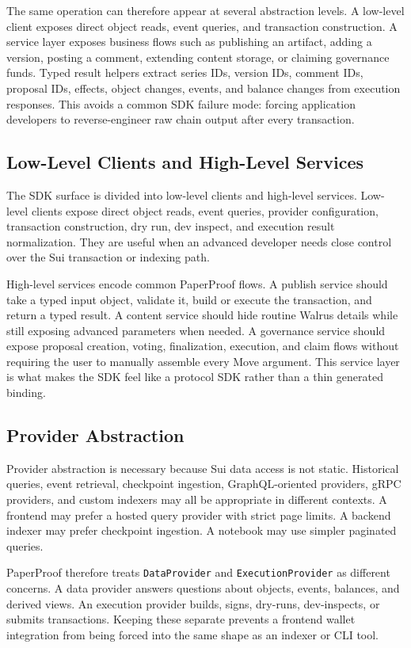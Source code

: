 \documentclass[journal]{IEEEtran}
\begin{document}
The same operation can therefore appear at several abstraction levels. A low-level client exposes direct object reads, event queries, and transaction construction. A service layer exposes business flows such as publishing an artifact, adding a version, posting a comment, extending content storage, or claiming governance funds. Typed result helpers extract series IDs, version IDs, comment IDs, proposal IDs, effects, object changes, events, and balance changes from execution responses. This avoids a common SDK failure mode: forcing application developers to reverse-engineer raw chain output after every transaction.

\subsection{Low-Level Clients and High-Level Services}

The SDK surface is divided into low-level clients and high-level services. Low-level clients expose direct object reads, event queries, provider configuration, transaction construction, dry run, dev inspect, and execution result normalization. They are useful when an advanced developer needs close control over the Sui transaction or indexing path.

High-level services encode common PaperProof flows. A publish service should take a typed input object, validate it, build or execute the transaction, and return a typed result. A content service should hide routine Walrus details while still exposing advanced parameters when needed. A governance service should expose proposal creation, voting, finalization, execution, and claim flows without requiring the user to manually assemble every Move argument. This service layer is what makes the SDK feel like a protocol SDK rather than a thin generated binding.

\subsection{Provider Abstraction}

Provider abstraction is necessary because Sui data access is not static. Historical queries, event retrieval, checkpoint ingestion, GraphQL-oriented providers, gRPC providers, and custom indexers may all be appropriate in different contexts. A frontend may prefer a hosted query provider with strict page limits. A backend indexer may prefer checkpoint ingestion. A notebook may use simpler paginated queries.

PaperProof therefore treats \texttt{DataProvider} and \texttt{ExecutionProvider} as different concerns. A data provider answers questions about objects, events, balances, and derived views. An execution provider builds, signs, dry-runs, dev-inspects, or submits transactions. Keeping these separate prevents a frontend wallet integration from being forced into the same shape as an indexer or CLI tool.
\end{document}
